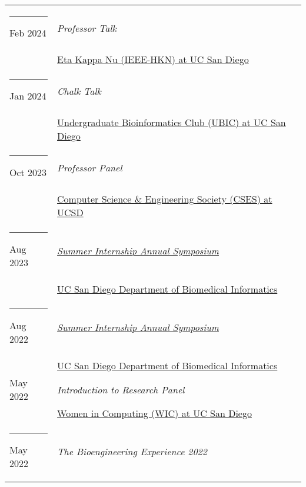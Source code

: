 \documentclass[margin,line]{res}
\begin{document}
\begin{resume}
\begin{longtable}{@{}p{0.7in}p{4in}}
\hspace*{-4mm} \rule{-1mm}{5mm} Feb 2024 & \textit{Professor Talk}\\*
\hspace*{-4mm} & \hspace{4mm} \href{https://hkn.ucsd.edu/}{Eta Kappa Nu (IEEE-HKN) at UC San Diego}\\
\hspace*{-4mm} \rule{-1mm}{5mm} Jan 2024 & \textit{Chalk Talk}\\*
\hspace*{-4mm} & \hspace{4mm} \href{http://ubicucsd.github.io/}{Undergraduate Bioinformatics Club (UBIC) at UC San Diego}\\
\hspace*{-4mm} \rule{-1mm}{5mm} Oct 2023 & \textit{Professor Panel}\\*
\hspace*{-4mm} & \hspace{4mm} \href{https://csesucsd.com/}{Computer Science \& Engineering Society (CSES) at UCSD}\\
\hspace*{-4mm} \rule{-1mm}{5mm} Aug 2023 & \href{https://dbmi.ucsd.edu/education/internships/index.html}{\textit{Summer Internship Annual Symposium}}\\*
\hspace*{-4mm} & \hspace{4mm} \href{https://dbmi.ucsd.edu/}{UC San Diego Department of Biomedical Informatics}\\
\hspace*{-4mm} \rule{-1mm}{5mm} Aug 2022 & \href{https://dbmi.ucsd.edu/education/internships/index.html}{\textit{Summer Internship Annual Symposium}}\\*
\hspace*{-4mm} & \hspace{4mm} \href{https://dbmi.ucsd.edu/}{UC San Diego Department of Biomedical Informatics}\\
\hspace*{-4mm} May 2022 & \textit{Introduction to Research Panel}\\*
\hspace*{-4mm} & \hspace{4mm} \href{http://wic.ucsd.edu/}{Women in Computing (WIC) at UC San Diego}\\
\hspace*{-4mm} \rule{-1mm}{5mm} May 2022 & \textit{The Bioengineering Experience 2022}\\*

\end{longtable}
\end{resume}
\end{document}

